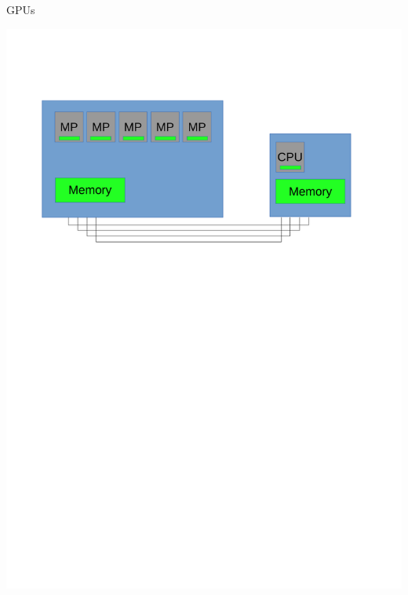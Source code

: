 \documentclass[xcolor=dvipsnames]{beamer}
\begin{document}
\begin{frame}{GPUs} 

\includegraphics[width=\linewidth]{GPU1.pdf}


\end{frame} 
\end{document}

